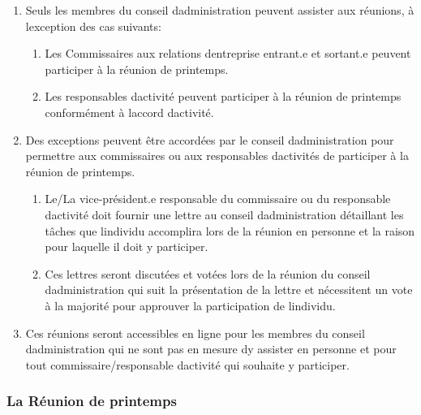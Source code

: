\begin{enumerate}
 \item
  Seuls les membres du conseil d\textquotesingle administration peuvent assister aux réunions, à l\textquotesingle exception des cas suivants:

  \begin{enumerate}
   \item
    Les Commissaires aux relations d\textquotesingle entreprise entrant.e et sortant.e peuvent participer à la réunion de printemps.
   \item
    Les responsables d\textquotesingle activité peuvent participer à la réunion de printemps conformément à l\textquotesingle accord d\textquotesingle activité.
  \end{enumerate}
 \item
  Des exceptions peuvent être accordées par le conseil d\textquotesingle administration pour permettre aux commissaires ou aux responsables d\textquotesingle activités de participer à la réunion de printemps.

  \begin{enumerate}
   \item
    Le/La vice-président.e responsable du commissaire ou du responsable d\textquotesingle activité doit fournir une lettre au conseil d\textquotesingle administration détaillant les tâches que l\textquotesingle individu accomplira lors de la réunion en personne et la raison pour laquelle il doit y participer.
   \item
    Ces lettres seront discutées et votées lors de la réunion du conseil d\textquotesingle administration qui suit la présentation de la lettre et nécessitent un vote à la majorité pour approuver la participation de l\textquotesingle individu.
  \end{enumerate}
 \item
  Ces réunions seront accessibles en ligne pour les membres du conseil d\textquotesingle administration qui ne sont pas en mesure d\textquotesingle y assister en personne et pour tout commissaire/responsable d\textquotesingle activité qui souhaite y participer.
\end{enumerate}

\subsubsection{La Réunion de printemps}
\label{la-reunion-de-printemps}

